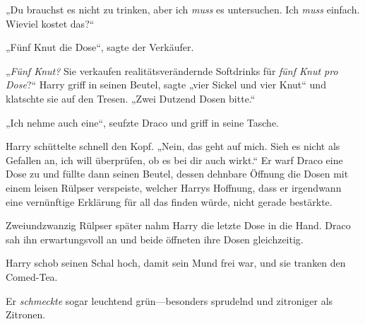 „Du brauchst es nicht zu trinken, aber ich \emph{muss} es untersuchen. Ich \emph{muss} einfach. Wieviel kostet das?“

„Fünf Knut die Dose“, sagte der Verkäufer.

„\emph{Fünf Knut?} Sie verkaufen realitätsverändernde Softdrinks für \emph{fünf Knut pro Dose}?“ Harry griff in seinen Beutel, sagte „vier Sickel und vier Knut“ und klatschte sie auf den Tresen. „Zwei Dutzend Dosen bitte.“

„Ich nehme auch eine“, seufzte Draco und griff in seine Tasche.

Harry schüttelte schnell den Kopf. „Nein, das geht auf mich. Sieh es nicht als Gefallen an, ich will überprüfen, ob es bei dir auch wirkt.“ Er warf Draco eine Dose zu und füllte dann seinen Beutel, dessen dehnbare Öffnung die Dosen mit einem leisen Rülpser verspeiste, welcher Harrys Hoffnung, dass er irgendwann eine vernünftige Erklärung für all das finden würde, nicht gerade bestärkte.

Zweiundzwanzig Rülpser später nahm Harry die letzte Dose in die Hand. Draco sah ihn erwartungsvoll an und beide öffneten ihre Dosen gleichzeitig.

Harry schob seinen Schal hoch, damit sein Mund frei war, und sie tranken den Comed-Tea.

Er \emph{schmeckte} sogar leuchtend grün—besonders sprudelnd und zitroniger als Zitronen.

